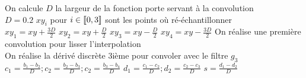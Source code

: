  \begin{algorithm}
 \caption{$eval4Integral(img,Img,xy)$}
 \end{algorithm}
 
 \begin{algorithm}
 \caption{$convolImg(img,Img,xy,d)$}
 On calcule $D$ la largeur de la fonction porte servant à la convolution\\
 {
 $D=0.2$\;
 }
 $xy_{i}$ pour $i\in \llbracket 0,3 \rrbracket $ sont les points où ré-échantillonner\\
 $xy_{1}  = xy + \frac{3D}{2}$\; 
 $xy_{2}  = xy + \frac{D}{2}$\; 
 $xy_{3}  = xy - \frac{D}{2}$\; 
 $xy_{4}  = xy - \frac{3D}{2}$\;
 On réalise une première convolution pour lisser l'interpolation\\
 On réalise la dérivé discrète $3$ième pour convoler avec le filtre $g_3$\; 
 $c_1 = \frac{b_1 - b_2}{D}; c_2=\frac{b_2 - b_3}{D}; c_2=\frac{b_3 - b_4}{D}$\; 
 $d_1 = \frac{c_1 - c_2}{D}; d_2=\frac{c_2 - c_3}{D}$\; 
 $s = \frac{d_1 - d_2}{D}$\; 
 \end{algorithm}
